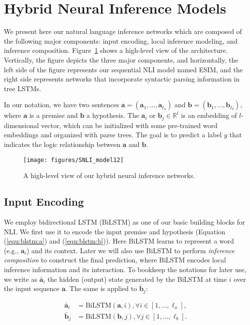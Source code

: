 \documentclass[11pt,a4paper]{article}
\newcommand{\vect}[1]{\mathbf{#1}}
\newcommand{\RR}[0]{\mathbb{R}}
\begin{document}
\section{Hybrid Neural Inference Models}

We present here our natural language inference networks which are composed of the following major components: input encoding, local inference modeling, and inference composition. Figure~\ref{fig:snli} shows a high-level view of the architecture. Vertically, the figure depicts the three major components, and horizontally, the left side of the figure represents our sequential NLI model named ESIM, and the right side represents networks that incorporate syntactic parsing information in tree LSTMs.

In our notation, we have two sentences $\vect{a}=(\vect{a}_1,\dots,\vect{a}_{\ell_a})$ and $\vect{b}=(\vect{b}_1,\dots,\vect{b}_{\ell_b})$, where $\vect{a}$ is a premise and $\vect{b}$ a hypothesis. The $\vect{a}_i$ or $\vect{b}_j \in \RR^l $ is an embedding of $l$-dimensional vector, which can be initialized with some pre-trained word embeddings and organized with parse trees. The goal is to predict a label $y$ that indicates the logic relationship between $\vect{a}$ and $\vect{b}$.
\begin{figure}[!htb]
	\centering
	\texttt{[image: figures/SNLI\_model12]}
	\caption{A high-level view of our hybrid neural inference networks.}
	\label{fig:snli}
\end{figure}

\subsection{Input Encoding}
We employ bidirectional LSTM (BiLSTM) as one of our basic building blocks for NLI. We first use it to encode the input premise and hypothesis (Equation (\ref{equ:blstm:a}) and (\ref{equ:blstm:b})). Here BiLSTM learns to represent a word (e.g., $\vect{a}_i$) and its context. Later we will also use BiLSTM to perform \textit{inference composition} to construct the final prediction, where BiLSTM encodes local inference information and its interaction. To bookkeep the notations for later use, we write as $\bar{\vect{a}}_i$ the hidden (output) state generated by the BiLSTM at time $i$ over the input sequence $\vect{a}$. The same is applied to $\bar{\vect{b}}_j$:

{\fontsize{10pt}{1.0cm}
 	\begin{align}
         \label{equ:blstm:a}
 		\bar{\vect{a}}_i&=\text{BiLSTM}(\vect{a},i),\forall i \in [1, \dots, \ell_a],\\
 		\bar{\vect{b}}_j&=\text{BiLSTM}(\vect{b},j),\forall j \in [1, \dots, \ell_b].
         \label{equ:blstm:b}
 	\end{align}
}
\end{document}

